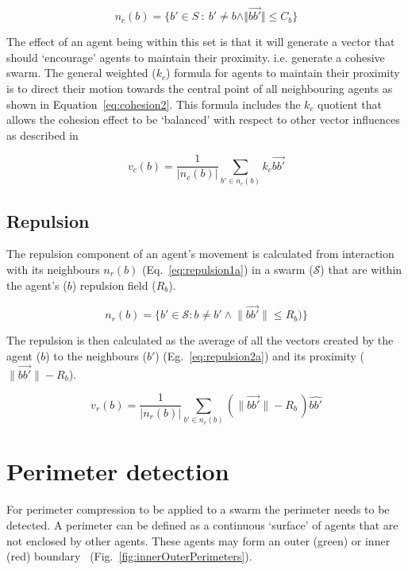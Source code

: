 \documentclass[12pt,a4paper]{IEEEtran}
\newcommand{\magn}[1]{\Vert{#1}\Vert}
\begin{document}
\begin{equation}\label{eq:cohesion1}
n_c(b) = \{b' \in S~:~b' \neq b \land\magn{\vec{bb'}} \leq C_b\}
\end{equation}

The effect of an agent being within this set is that it will generate a vector that should `encourage' agents to maintain their proximity. i.e. generate a cohesive swarm. The general weighted ($k_c$) formula for agents to maintain their proximity is to direct their motion towards the central point of all neighbouring agents as shown in Equation~\ref{eq:cohesion2}. This formula includes the $k_c$ quotient that allows the cohesion effect to be `balanced' with respect to other vector influences as described in ~\cite{eliot2017methods,eliot2018metric,eliot2019void} 

\begin{equation}\label{eq:cohesion2}
v_c(b) = \frac{1}{\lvert n_c(b)\rvert} \sum_{b' \in n_c(b)}k_c\vec{bb'}
\end{equation}

\subsection{Repulsion}\label{repulsion:neighbours}
The repulsion component of an agent's movement is calculated from interaction with its neighbours $n_r(b)$ (Eq.~\ref{eq:repulsion1a}) in a swarm ($\mathcal{S}$) that are within the agent's ($b$) repulsion field ($R_b$).

\begin{equation}\label{eq:repulsion1a}
n_r(b) = \{b' \in \mathcal{S} : b \neq b' \land \lVert\vec{bb'}\rVert \leq R_b)\}
\end{equation}

The repulsion is then calculated as the average of all the vectors created by the agent ($b$) to the neighbours ($b'$) (Eg.~\ref{eq:repulsion2a}) and its proximity ($\lVert\vec{bb'}\rVert - R_b$).

\begin{equation}\label{eq:repulsion2a}
v_r(b) = \frac{1}{\lvert n_r(b)\rvert}\sum_{b' \in n_r(b)} \left(\lVert\vec{bb'}\rVert - R_b \, \right)\widehat{bb'}
\end{equation}

\section{Perimeter detection}\label{sec:perimeterDetection}
For perimeter compression to be applied to a swarm the perimeter needs to be detected. A perimeter can be defined as a continuous `surface' of agents that are not enclosed by other agents. These  agents may form an outer ({\color{green}green}) or inner ({\color{red}red}) boundary ~(Fig.~\ref{fig:innerOuterPerimeters}).
\end{document}
